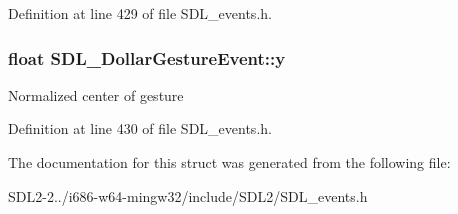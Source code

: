 Definition at line 429 of file S\+D\+L\+\_\+events.\+h.

\hypertarget{structSDL__DollarGestureEvent_a293b2303acc1cfc63c167c5525e6eab5}{
\subsubsection[{y}]{\setlength{\rightskip}{0pt plus 5cm}float S\+D\+L\+\_\+\+Dollar\+Gesture\+Event\+::y}}\label{structSDL__DollarGestureEvent_a293b2303acc1cfc63c167c5525e6eab5}
Normalized center of gesture 

Definition at line 430 of file S\+D\+L\+\_\+events.\+h.



The documentation for this struct was generated from the following file\+:\begin{DoxyCompactItemize}
\item 
S\+D\+L2-\/2../i686-\/w64-\/mingw32/include/\+S\+D\+L2/S\+D\+L\+\_\+events.\+h\end{DoxyCompactItemize}
